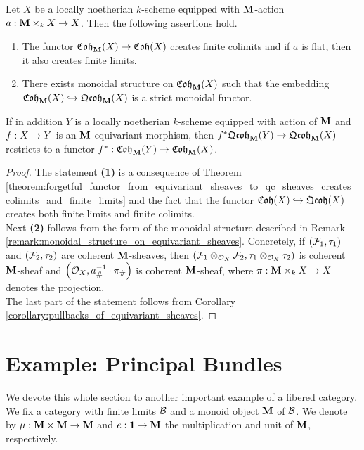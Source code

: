 \begin{corollary}\label{corollary:coherent_equivariant_sheaves_properties}
Let $X$ be a locally noetherian $k$-scheme equipped with $\mathbf{M}$-action $a:\mathbf{M}\times_kX\rightarrow X$. Then the following assertions hold.
\begin{enumerate}[label= \emph{\textbf{(\arabic*)}}, leftmargin=3.0em]
\item The functor $\mathfrak{Coh}_{\mathbf{M}}(X)\rightarrow \mathfrak{Coh}(X)$ creates finite colimits and if $a$ is flat, then it also creates finite limits.
\item There exists monoidal structure on $\mathfrak{Coh}_{\mathbf{M}}(X)$ such that the embedding $\mathfrak{Coh}_{\mathbf{M}}(X)\hookrightarrow \mathfrak{Qcoh}_{\mathbf{M}}(X)$ is a strict monoidal functor.
\end{enumerate}
If in addition $Y$ is a locally noetherian $k$-scheme equipped with action of $\mathbf{M}$ and $f:X\rightarrow Y$ is an $\mathbf{M}$-equivariant morphism, then $f^*\mathfrak{Qcoh}_{\mathbf{M}}(Y)\rightarrow \mathfrak{Qcoh}_{\mathbf{M}}(X)$ restricts to a functor $f^*:\mathfrak{Coh}_{\mathbf{M}}(Y)\rightarrow \mathfrak{Coh}_{\mathbf{M}}(X)$.
\end{corollary}
\begin{proof}
The statement \textbf{(1)} is a consequence of Theorem \ref{theorem:forgetful_functor_from_equivariant_sheaves_to_qc_sheaves_creates_colimits_and_finite_limits} and the fact that the functor $\mathfrak{Coh}(X)\hookrightarrow \mathfrak{Qcoh}(X)$ creates both finite limits and finite colimits.\\
Next \textbf{(2)} follows from the form of the monoidal structure described in Remark \ref{remark:monoidal_structure_on_equivariant_sheaves}. Concretely, if $({\mathcal F}_1,\tau_1)$ and $({\mathcal F}_2,\tau_2)$ are coherent $\mathbf{M}$-sheaves, then $\left({\mathcal F}_1\otimes_{{\mathcal O}_X}{\mathcal F}_2,\tau_1\otimes_{{\mathcal O}_X}\tau_2\right)$ is coherent $\mathbf{M}$-sheaf and $\left({\mathcal O}_X,a_{\#}^{-1}\cdot \pi_{\#}\right)$ is coherent $\mathbf{M}$-sheaf, where $\pi:\mathbf{M}\times_kX\rightarrow X$ denotes the projection.\\
The last part of the statement follows from Corollary \ref{corollary:pullbacks_of_equivariant_sheaves}.
\end{proof}

\section{Example: Principal Bundles}
\noindent
We devote this whole section to another important example of a fibered category. We fix a category with finite limits ${\mathcal B}$ and a monoid object $\mathbf{M}$ of ${\mathcal B}$. We denote by $\mu:\mathbf{M}\times \mathbf{M}\rightarrow \mathbf{M}$ and $e:\mathbf{1}\rightarrow \mathbf{M}$ the multiplication and unit of $\mathbf{M}$, respectively.

